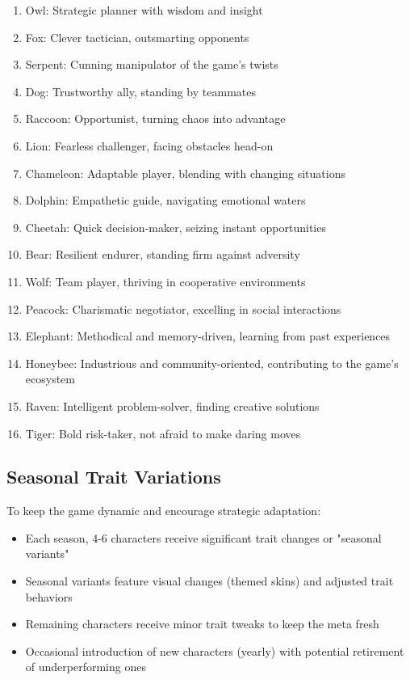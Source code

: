 \documentclass[]{article}
\begin{document}
\begin{enumerate}
\item Owl: Strategic planner with wisdom and insight
\item Fox: Clever tactician, outsmarting opponents
\item Serpent: Cunning manipulator of the game's twists
\item Dog: Trustworthy ally, standing by teammates
\item Raccoon: Opportunist, turning chaos into advantage
\item Lion: Fearless challenger, facing obstacles head-on
\item Chameleon: Adaptable player, blending with changing situations
\item Dolphin: Empathetic guide, navigating emotional waters
\item Cheetah: Quick decision-maker, seizing instant opportunities
\item Bear: Resilient endurer, standing firm against adversity
\item Wolf: Team player, thriving in cooperative environments
\item Peacock: Charismatic negotiator, excelling in social interactions
\item Elephant: Methodical and memory-driven, learning from past experiences
\item Honeybee: Industrious and community-oriented, contributing to the game's ecosystem
\item Raven: Intelligent problem-solver, finding creative solutions
\item Tiger: Bold risk-taker, not afraid to make daring moves
\end{enumerate}

\subsection{Seasonal Trait Variations}

To keep the game dynamic and encourage strategic adaptation:

\begin{itemize}
\item Each season, 4-6 characters receive significant trait changes or "seasonal variants"
\item Seasonal variants feature visual changes (themed skins) and adjusted trait behaviors
\item Remaining characters receive minor trait tweaks to keep the meta fresh
\item Occasional introduction of new characters (yearly) with potential retirement of underperforming ones
\end{itemize}
\end{document}
